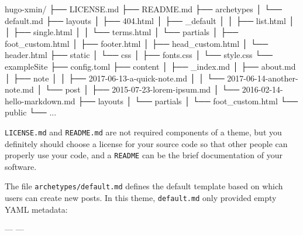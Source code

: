 \documentclass[12pt,]{krantz}
\makeatletter
\newenvironment{Shaded}{\begin{snugshade}}{\end{snugshade}}
\newcommand{\ExtensionTok}[1]{#1}
\newcommand{\NormalTok}[1]{#1}
\newcommand{\OtherTok}[1]{\textcolor[rgb]{0.56,0.35,0.01}{#1}}
\newenvironment{kframe}{%
\medskip{}
\setlength{\fboxsep}{.8em}
 \def\at@end@of@kframe{}%
 \ifinner\ifhmode%
  \def\at@end@of@kframe{\end{minipage}}%
  \begin{minipage}{\columnwidth}%
 \fi\fi%
 \def\FrameCommand##1{\hskip\@totalleftmargin \hskip-\fboxsep
 \colorbox{shadecolor}{##1}\hskip-\fboxsep
     \hskip-\linewidth \hskip-\@totalleftmargin \hskip\columnwidth}%
 \MakeFramed {\advance\hsize-\width
   \@totalleftmargin\z@ \linewidth\hsize
   \@setminipage}}%
 {\par\unskip\endMakeFramed%
 \at@end@of@kframe}
\renewenvironment{Shaded}{\begin{kframe}}{\end{kframe}}
\theoremstyle{definition}
\theoremstyle{definition}
\theoremstyle{definition}
\theoremstyle{remark}
\makeatother
\begin{document}
\begin{Shaded}
\begin{Highlighting}[]
\ExtensionTok{hugo-xmin/}
\NormalTok{├── }\ExtensionTok{LICENSE.md}
\NormalTok{├── }\ExtensionTok{README.md}
\NormalTok{├── }\ExtensionTok{archetypes}
\NormalTok{│   └── }\ExtensionTok{default.md}
\NormalTok{├── }\ExtensionTok{layouts}
\NormalTok{│   ├── }\ExtensionTok{404.html}
\NormalTok{│   ├── }\ExtensionTok{_default}
\NormalTok{│   │   ├── }\ExtensionTok{list.html}
\NormalTok{│   │   ├── }\ExtensionTok{single.html}
\NormalTok{│   │   └── }\ExtensionTok{terms.html}
\NormalTok{│   └── }\ExtensionTok{partials}
\NormalTok{│       ├── }\ExtensionTok{foot_custom.html}
\NormalTok{│       ├── }\ExtensionTok{footer.html}
\NormalTok{│       ├── }\ExtensionTok{head_custom.html}
\NormalTok{│       └── }\ExtensionTok{header.html}
\NormalTok{├── }\ExtensionTok{static}
\NormalTok{│   └── }\ExtensionTok{css}
\NormalTok{│       ├── }\ExtensionTok{fonts.css}
\NormalTok{│       └── }\ExtensionTok{style.css}
\NormalTok{└── }\ExtensionTok{exampleSite}
\NormalTok{    ├── }\ExtensionTok{config.toml}
\NormalTok{    ├── }\ExtensionTok{content}
\NormalTok{    │   ├── }\ExtensionTok{_index.md}
\NormalTok{    │   ├── }\ExtensionTok{about.md}
\NormalTok{    │   ├── }\ExtensionTok{note}
\NormalTok{    │   │   ├── }\ExtensionTok{2017-06-13-a-quick-note.md}
\NormalTok{    │   │   └── }\ExtensionTok{2017-06-14-another-note.md}
\NormalTok{    │   └── }\ExtensionTok{post}
\NormalTok{    │       ├── }\ExtensionTok{2015-07-23-lorem-ipsum.md}
\NormalTok{    │       └── }\ExtensionTok{2016-02-14-hello-markdown.md}
\NormalTok{    ├── }\ExtensionTok{layouts}
\NormalTok{    │   └── }\ExtensionTok{partials}
\NormalTok{    │       └── }\ExtensionTok{foot_custom.html}
\NormalTok{    └── }\ExtensionTok{public}
\NormalTok{        └── }\ExtensionTok{...}
\end{Highlighting}
\end{Shaded}

\texttt{LICENSE.md} and \texttt{README.md} are not required components
of a theme, but you definitely should choose a license for your source
code so that other people can properly use your code, and a
\texttt{README} can be the brief documentation of your software.

The file \texttt{archetypes/default.md} defines the default template
based on which users can create new posts. In this theme,
\texttt{default.md} only provided empty YAML metadata:

\begin{Shaded}
\begin{Highlighting}[]
\OtherTok{---}
\OtherTok{---}
\end{Highlighting}
\end{Shaded}
\end{document}

